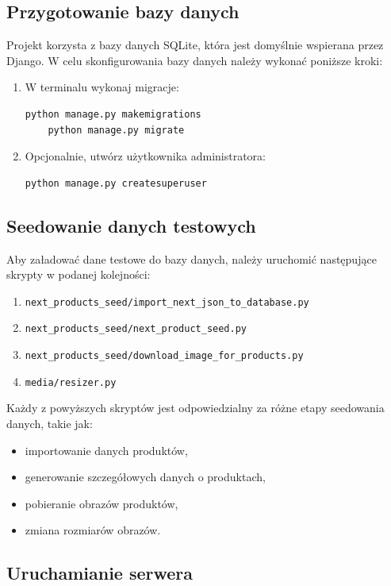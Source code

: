 \documentclass[12pt,a4paper,oneside]{article}
\theoremstyle{definition}
\numberwithin{equation}{section}
\begin{document}
\subsection{Przygotowanie bazy danych}

Projekt korzysta z bazy danych SQLite, która jest domyślnie wspierana przez Django. W celu skonfigurowania bazy danych należy wykonać poniższe kroki:
\begin{enumerate}
    \item W terminalu wykonaj migracje:
    \begin{lstlisting}[language=bash]
    python manage.py makemigrations
    python manage.py migrate
    \end{lstlisting}
    \item Opcjonalnie, utwórz użytkownika administratora:
    \begin{lstlisting}[language=bash]
    python manage.py createsuperuser
    \end{lstlisting}
\end{enumerate}

\subsection{Seedowanie danych testowych}

Aby załadować dane testowe do bazy danych, należy uruchomić następujące skrypty w podanej kolejności:
\begin{enumerate}
    \item \texttt{next\_products\_seed/import\_next\_json\_to\_database.py}
    \item \texttt{next\_products\_seed/next\_product\_seed.py}
    \item \texttt{next\_products\_seed/download\_image\_for\_products.py}
    \item \texttt{media/resizer.py}
\end{enumerate}

Każdy z powyższych skryptów jest odpowiedzialny za różne etapy seedowania danych, takie jak:
\begin{itemize}
    \item importowanie danych produktów,
    \item generowanie szczegółowych danych o produktach,
    \item pobieranie obrazów produktów,
    \item zmiana rozmiarów obrazów.
\end{itemize}

\subsection{Uruchamianie serwera}
\end{document}
